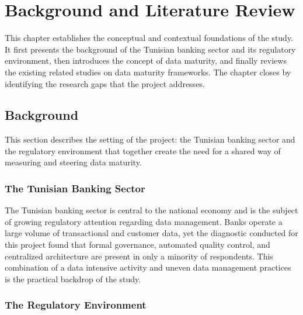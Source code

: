 
\setlength{\arrayrulewidth}{0.5pt}
\renewcommand{\arraystretch}{1.3}
\section{Background and Literature Review}

This chapter establishes the conceptual and contextual foundations of the study. It first presents the background of the Tunisian banking sector and its regulatory environment, then introduces the concept of data maturity, and finally reviews the existing related studies on data maturity frameworks. The chapter closes by identifying the research gaps that the project addresses.

\subsection{Background}

This section describes the setting of the project: the Tunisian banking sector and the regulatory environment that together create the need for a shared way of measuring and steering data maturity.

\subsubsection{The Tunisian Banking Sector}

The Tunisian banking sector is central to the national economy and is the subject of growing regulatory attention regarding data management. Banks operate a large volume of transactional and customer data, yet the diagnostic conducted for this project found that formal governance, automated quality control, and centralized architecture are present in only a minority of respondents. This combination of a data intensive activity and uneven data management practices is the practical backdrop of the study.

\subsubsection{The Regulatory Environment}

